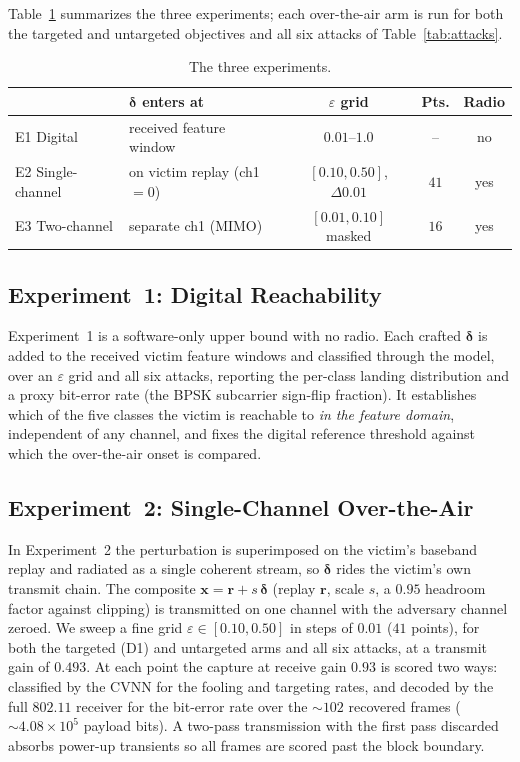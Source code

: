 \documentclass[11pt]{article}
\begin{document}
Table~\ref{tab:exps} summarizes the three experiments; each over-the-air arm is run for both the
targeted and untargeted objectives and all six attacks of Table~\ref{tab:attacks}.

\begin{table}[t]\centering
\caption{The three experiments.}
\label{tab:exps}
\begin{tabular}{llccc}
\hline
 & $\boldsymbol\delta$ enters at & $\varepsilon$ grid & Pts. & Radio\\
\hline
E1 Digital        & received feature window   & $0.01$--$1.0$            & --  & no\\
E2 Single-channel & on victim replay (ch1$=$0)& $[0.10,0.50]$, $\Delta 0.01$ & $41$ & yes\\
E3 Two-channel    & separate ch1 (MIMO)       & $[0.01,0.10]$ masked     & $16$ & yes\\
\hline
\end{tabular}
\end{table}

\subsection{Experiment~1: Digital Reachability}
Experiment~1 is a software-only upper bound with no radio. Each crafted $\boldsymbol\delta$ is
added to the received victim feature windows and classified through the model, over an
$\varepsilon$ grid and all six attacks, reporting the per-class landing distribution and a proxy
bit-error rate (the BPSK subcarrier sign-flip fraction). It establishes which of the five classes
the victim is reachable to \emph{in the feature domain}, independent of any channel, and fixes the
digital reference threshold against which the over-the-air onset is compared.

\subsection{Experiment~2: Single-Channel Over-the-Air}
In Experiment~2 the perturbation is superimposed on the victim's baseband replay and radiated as a
single coherent stream, so $\boldsymbol\delta$ rides the victim's own transmit chain. The composite
$\mathbf x=\mathbf r+s\,\boldsymbol\delta$ (replay $\mathbf r$, scale $s$, a $0.95$ headroom factor
against clipping) is transmitted on one channel with the adversary channel zeroed. We sweep a fine
grid $\varepsilon\in[0.10,0.50]$ in steps of $0.01$ ($41$ points), for both the targeted (D1) and
untargeted arms and all six attacks, at a transmit gain of $0.493$. At each point the capture at
receive gain $0.93$ is scored two ways: classified by the CVNN for the fooling and targeting
rates, and decoded by the full $802.11$ receiver for the bit-error rate over the $\sim\!102$
recovered frames ($\sim\!4.08\times10^{5}$ payload bits). A two-pass transmission with the first
pass discarded absorbs power-up transients so all frames are scored past the block boundary.
\end{document}

